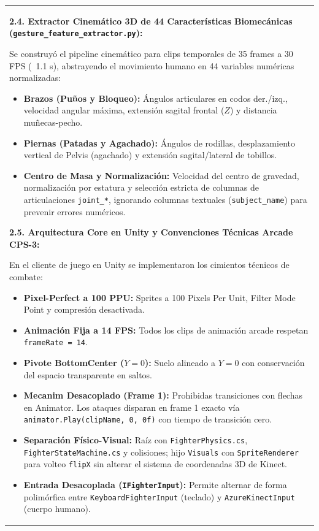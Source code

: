 \documentclass[10pt,a4paper]{article}
\begin{document}
{
\setlength{\tabcolsep}{0.19cm}
\setlength{\arrayrulewidth}{0.5pt}
\fontsize{9pt}{11pt}\selectfont

\noindent
\begin{tabularx}{\textwidth}{|X|}
\hline
\parbox[t]{\dimexpr\textwidth-2\tabcolsep\relax}{%
    \vspace{0.15cm}
    \textbf{2.4. Extractor Cinemático 3D de 44 Características Biomecánicas (\texttt{gesture\_feature\_extractor.py}):}\par
    Se construyó el pipeline cinemático para clips temporales de 35 frames a 30 FPS (~1.1 s), abstrayendo el movimiento humano en 44 variables numéricas normalizadas:
    \begin{itemize}[noitemsep,topsep=2pt]
        \item \textbf{Brazos (Puños y Bloqueo):} Ángulos articulares en codos der./izq., velocidad angular máxima, extensión sagital frontal ($Z$) y distancia muñecas-pecho.
        \item \textbf{Piernas (Patadas y Agachado):} Ángulos de rodillas, desplazamiento vertical de Pelvis (agachado) y extensión sagital/lateral de tobillos.
        \item \textbf{Centro de Masa y Normalización:} Velocidad del centro de gravedad, normalización por estatura y selección estricta de columnas de articulaciones \texttt{joint\_*}, ignorando columnas textuales (\texttt{subject\_name}) para prevenir errores numéricos.
    \end{itemize}

    \vspace{0.15cm}
    \textbf{2.5. Arquitectura Core en Unity y Convenciones Técnicas Arcade CPS-3:}\par
    En el cliente de juego en Unity se implementaron los cimientos técnicos de combate:
    \begin{itemize}[noitemsep,topsep=2pt]
        \item \textbf{Pixel-Perfect a 100 PPU:} Sprites a 100 Pixels Per Unit, Filter Mode Point y compresión desactivada.
        \item \textbf{Animación Fija a 14 FPS:} Todos los clips de animación arcade respetan \texttt{frameRate = 14}.
        \item \textbf{Pivote BottomCenter ($Y=0$):} Suelo alineado a $Y=0$ con conservación del espacio transparente en saltos.
        \item \textbf{Mecanim Desacoplado (Frame 1):} Prohibidas transiciones con flechas en Animator. Los ataques disparan en frame 1 exacto vía \texttt{animator.Play(clipName, 0, 0f)} con tiempo de transición cero.
        \item \textbf{Separación Físico-Visual:} Raíz con \texttt{FighterPhysics.cs}, \texttt{FighterStateMachine.cs} y colisiones; hijo \texttt{Visuals} con \texttt{SpriteRenderer} para volteo \texttt{flipX} sin alterar el sistema de coordenadas 3D de Kinect.
        \item \textbf{Entrada Desacoplada (\texttt{IFighterInput}):} Permite alternar de forma polimórfica entre \texttt{KeyboardFighterInput} (teclado) y \texttt{AzureKinectInput} (cuerpo humano).
    \end{itemize}

}
\end{tabularx}}
\end{document}
